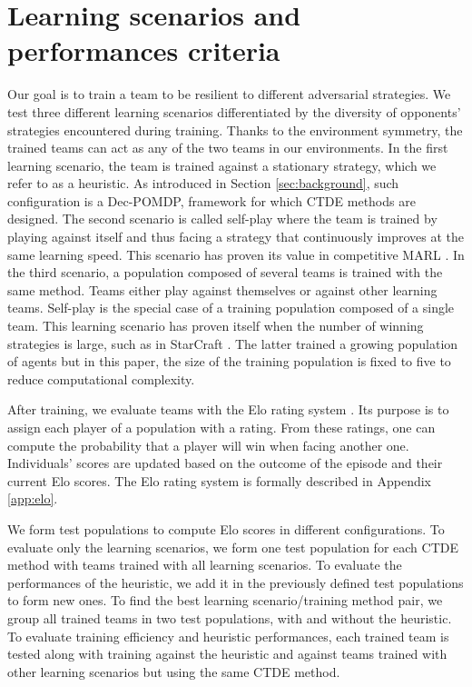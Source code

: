 \section{Learning scenarios and performances criteria}
Our goal is to train a team to be resilient to different adversarial strategies.
We test three different learning scenarios differentiated by the diversity of opponents' strategies encountered during training.
Thanks to the environment symmetry, the trained teams can act as any of the two teams in our environments.
In the first learning scenario, the team is trained against a stationary strategy, which we refer to as a heuristic.
As introduced in Section \ref{sec:background}, such configuration is a Dec-POMDP, framework for which CTDE methods are designed.
The second scenario is called self-play where the team is trained by playing against itself and thus facing a strategy that continuously improves at the same learning speed.
This scenario has proven its value in competitive MARL \citep{baker2019emergent}.
In the third scenario, a population composed of several teams is trained with the same method.
Teams either play against themselves or against other learning teams.
Self-play is the special case of a training population composed of a single team.
This learning scenario has proven itself when the number of winning strategies is large, such as in StarCraft \citep{vinyals2019grandmaster}.
The latter trained a growing population of agents but in this paper, the size of the training population is fixed to five to reduce computational complexity.

After training, we evaluate teams with the Elo rating system \citep{elo1978rating}.
Its purpose is to assign each player of a population with a rating.
From these ratings, one can compute the probability that a player will win when facing another one.
Individuals' scores are updated based on the outcome of the episode  and their current Elo scores.
The Elo rating system is formally described in Appendix \ref{app:elo}.

We form test populations to compute Elo scores in different configurations.
To evaluate only the learning scenarios, we form one test population for each CTDE method with teams trained with all learning scenarios.
To evaluate the performances of the heuristic, we add it in the previously defined test populations to form new ones.
To find the best learning scenario/training method pair, we group all trained teams in two test populations, with and without the heuristic.
To evaluate training efficiency and heuristic performances, each trained team is tested along with training against the heuristic and against teams trained with other learning scenarios but using the same CTDE method.

